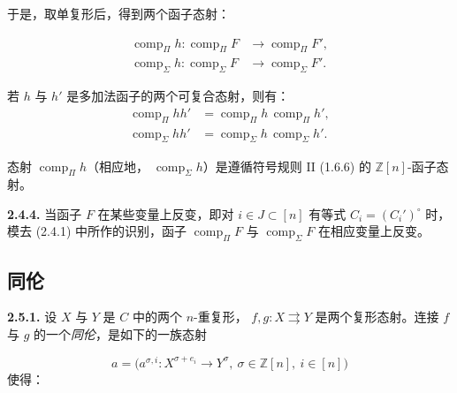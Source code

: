 \clearpage
{}%
于是，取单复形后，得到两个函子态射：

\begin{equation}
  \begin{aligned}
    \operatorname{comp}_{\Pi}h\colon
      \operatorname{comp}_{\Pi}F
      &\longrightarrow \operatorname{comp}_{\Pi}F',\\
    \operatorname{comp}_{\Sigma}h\colon
      \operatorname{comp}_{\Sigma}F
      &\longrightarrow \operatorname{comp}_{\Sigma}F'.
  \end{aligned}
  \tag{2.4.3.2}
\end{equation}

若 $h$ 与 $h'$ 是多加法函子的两个可复合态射，则有：
\begin{equation*}
  \begin{aligned}
    \operatorname{comp}_{\Pi}hh'
      &=\operatorname{comp}_{\Pi}h\,\operatorname{comp}_{\Pi}h',\\
    \operatorname{comp}_{\Sigma}hh'
      &=\operatorname{comp}_{\Sigma}h\,\operatorname{comp}_{\Sigma}h'.
  \end{aligned}
\end{equation*}

态射 $\operatorname{comp}_{\Pi}h$（相应地，
$\operatorname{comp}_{\Sigma}h$）是遵循符号规则 II (1.6.6) 的
$\mathbb Z[n]$-函子态射。

\noindent\textbf{2.4.4.}\quad
当函子 $F$ 在某些变量上反变，即对 $i\in J\subset[n]$ 有等式
$C_i=(C_i')^\circ$ 时，模去 (2.4.1) 中所作的识别，函子
$\operatorname{comp}_{\Pi}F$ 与 $\operatorname{comp}_{\Sigma}F$
在相应变量上反变。

\subsection{同伦}

\noindent\textbf{2.5.1.}\quad
设 $X$ 与 $Y$ 是 $C$ 中的两个 $n$-重复形，
$f,g\colon X\rightrightarrows Y$ 是两个复形态射。连接 $f$ 与 $g$
的一个\emph{同伦}，是如下的一族态射

\begin{equation*}
  a=\bigl(a^{\sigma,i}\colon X^{\sigma+e_i}\longrightarrow Y^\sigma,
    \ \sigma\in\mathbb Z[n],\ i\in[n]\bigr)
\end{equation*}
使得：

